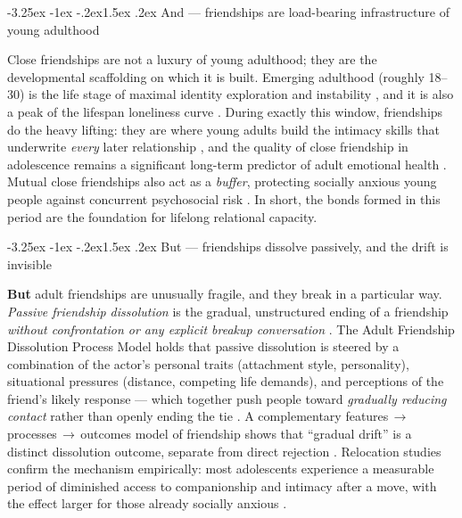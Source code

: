 \documentclass[11pt]{article}
\makeatletter
\renewcommand\subsection{\@startsection{subsection}{2}{\z@}%
  {-3.25ex \@plus -1ex \@minus -.2ex}{1.5ex \@plus .2ex}%
  {\normalfont\large\bfseries\color{accent}}}
\makeatother
\begin{document}
\subsection{And --- friendships are load-bearing infrastructure of young adulthood}

Close friendships are not a luxury of young adulthood; they are the
developmental scaffolding on which it is built. Emerging adulthood (roughly
18--30) is the life stage of maximal identity exploration and instability
\citep{arnett2000}, and it is also a peak of the lifespan loneliness curve
\citep{qualter2015, barreto2021}. During exactly this window, friendships do the
heavy lifting: they are where young adults build the intimacy skills that
underwrite \emph{every} later relationship \citep{rawlins2017}, and the quality
of close friendship in adolescence remains a significant long-term predictor of
adult emotional health \citep{allen2024}. Mutual close friendships also act as a
\emph{buffer}, protecting socially anxious young people against concurrent
psychosocial risk \citep{erath2010}. In short, the bonds formed in this period
are the foundation for lifelong relational capacity.

\subsection{But --- friendships dissolve passively, and the drift is invisible}

\textbf{But} adult friendships are unusually fragile, and they break in a
particular way. \emph{Passive friendship dissolution} is the gradual,
unstructured ending of a friendship \emph{without confrontation or any explicit
breakup conversation} \citep{vieth2022}. The Adult Friendship Dissolution
Process Model holds that passive dissolution is steered by a combination of the
actor's personal traits (attachment style, personality), situational pressures
(distance, competing life demands), and perceptions of the friend's likely
response --- which together push people toward \emph{gradually reducing contact}
rather than openly ending the tie \citep{vieth2022}. A complementary
features\,$\rightarrow$\,processes\,$\rightarrow$\,outcomes model of friendship
shows that ``gradual drift'' is a distinct dissolution outcome, separate from
direct rejection \citep{santucci2025}. Relocation studies confirm the mechanism
empirically: most adolescents experience a measurable period of diminished
access to companionship and intimacy after a move, with the effect larger for
those already socially anxious \citep{vernberg2006}.
\end{document}
